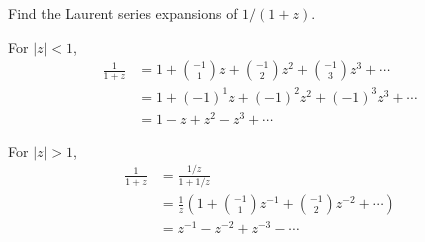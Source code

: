 \begin{Example}
  Find the Laurent series expansions of $1/(1 + z)$.

  For $|z| < 1$,
  \begin{align*}
    \frac{1}{1 + z} &= 1 + \binom{-1}{1} z + \binom{-1}{2} z^2 
    + \binom{-1}{3} z^3 + \cdots 
    \\
    &= 1 + (-1)^1 z + (-1)^2 z^2 + (-1)^3 z^3 + \cdots 
    \\
    &= 1 - z + z^2 - z^3 + \cdots
  \end{align*}

  For $|z| > 1$,
  \begin{align*}
    \frac{1}{1 + z} 
    &= \frac{1/z}{1 + 1/z} 
    \\
    &= \frac{1}{z} \left( 1 + \binom{-1}{1} z^{-1} + \binom{-1}{2} z^{-2}
      + \cdots \right)  
    \\
    &= z^{-1} - z^{-2} + z^{-3} - \cdots
  \end{align*}
\end{Example}









